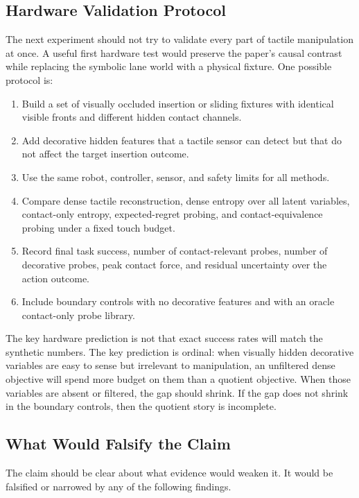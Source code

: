 \documentclass{article}
\begin{document}
\subsection{Hardware Validation Protocol}

The next experiment should not try to validate every part of tactile manipulation at once. A useful first hardware test would preserve the paper's causal contrast while replacing the symbolic lane world with a physical fixture. One possible protocol is:

\begin{enumerate}
    \item Build a set of visually occluded insertion or sliding fixtures with identical visible fronts and different hidden contact channels.
    \item Add decorative hidden features that a tactile sensor can detect but that do not affect the target insertion outcome.
    \item Use the same robot, controller, sensor, and safety limits for all methods.
    \item Compare dense tactile reconstruction, dense entropy over all latent variables, contact-only entropy, expected-regret probing, and contact-equivalence probing under a fixed touch budget.
    \item Record final task success, number of contact-relevant probes, number of decorative probes, peak contact force, and residual uncertainty over the action outcome.
    \item Include boundary controls with no decorative features and with an oracle contact-only probe library.
\end{enumerate}

The key hardware prediction is not that exact success rates will match the synthetic numbers. The key prediction is ordinal: when visually hidden decorative variables are easy to sense but irrelevant to manipulation, an unfiltered dense objective will spend more budget on them than a quotient objective. When those variables are absent or filtered, the gap should shrink. If the gap does not shrink in the boundary controls, then the quotient story is incomplete.

\subsection{What Would Falsify the Claim}

The claim should be clear about what evidence would weaken it. It would be falsified or narrowed by any of the following findings.
\end{document}
